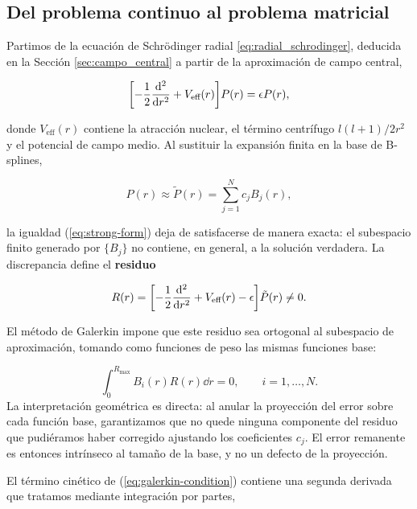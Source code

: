 \subsection{Del problema continuo al problema matricial}

Partimos de la ecuación de Schrödinger radial \eqref{eq:radial_schrodinger}, deducida en la Sección \ref{sec:campo_central} a partir de la aproximación de campo central,

\begin{equation}
\label{eq:strong-form}
  \qty[ - \frac{1}{2}\dv[2]{r} + V_{\text{eff}}(r) ] P(r) = \epsilon P(r),
\end{equation}

donde $V_{\text{eff}}(r)$ contiene la atracción nuclear, el término centrífugo $l(l+1)/2r^2$ y el potencial de campo medio. Al sustituir la expansión finita en la base de B-splines,

\begin{equation}
\label{eq:expansion-metodo}
  P(r) \approx \tilde{P}(r) = \sum_{j=1}^{N} c_j B_j(r),
\end{equation}

la igualdad (\ref{eq:strong-form}) deja de satisfacerse de manera exacta: el subespacio finito generado por $\{B_j\}$ no contiene, en general, a la solución verdadera. La discrepancia define el \textbf{residuo}

\begin{equation}
\label{eq:residuo}
  R(r) = \qty[ - \frac{1}{2}\dv[2]{r} + V_{\text{eff}}(r) - \epsilon ] \tilde{P}(r) \neq 0.
\end{equation}

El método de Galerkin impone que este residuo sea ortogonal al subespacio de aproximación, tomando como funciones de peso las mismas funciones base:

\begin{equation}
\label{eq:galerkin-condition}
  \int_{0}^{R_{\text{max}}} B_i(r) R(r) \dd{r} = 0, \qquad i = 1, \dots, N.
\end{equation}
La interpretación geométrica es directa: al anular la proyección del error sobre cada función base, garantizamos que no quede ninguna componente del residuo que pudiéramos haber corregido ajustando los coeficientes $c_j$. El error remanente es entonces intrínseco al tamaño de la base, y no un defecto de la proyección.

El término cinético de (\ref{eq:galerkin-condition}) contiene una segunda derivada que tratamos mediante integración por partes,


